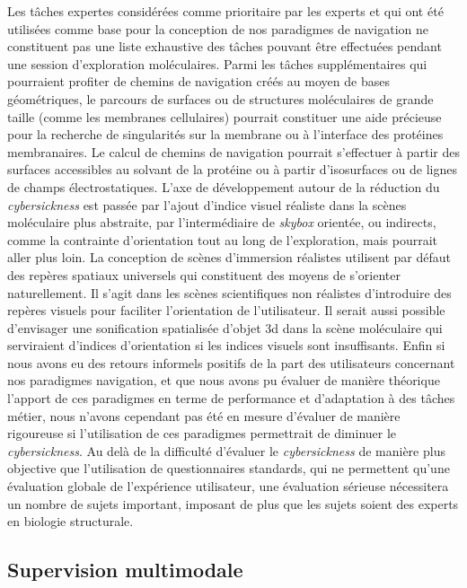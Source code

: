 Les tâches expertes considérées comme prioritaire par les experts et qui ont été utilisées comme base pour la conception de nos paradigmes de navigation ne constituent pas une liste exhaustive des tâches pouvant être effectuées pendant une session d'exploration moléculaires. Parmi les tâches supplémentaires qui pourraient profiter de chemins de navigation créés au moyen de bases géométriques, le parcours de surfaces ou de structures moléculaires de grande taille (comme les membranes cellulaires) pourrait constituer une aide précieuse pour la recherche de singularités sur la membrane ou à l'interface des protéines membranaires. Le calcul de chemins de navigation pourrait s'effectuer à partir des surfaces accessibles au solvant de la protéine ou à partir d'isosurfaces ou de lignes de champs électrostatiques. 
L'axe de développement autour de la réduction du \textit{cybersickness} est passée par l'ajout  d'indice visuel réaliste dans la scènes moléculaire plus abstraite, par l'intermédiaire de \textit{skybox} orientée, ou indirects, comme la contrainte d'orientation tout au long de l'exploration, mais pourrait aller plus loin. La conception de scènes d'immersion réalistes utilisent par défaut des repères spatiaux universels qui constituent des moyens de s'orienter naturellement. Il s'agit dans les scènes scientifiques non réalistes d'introduire des repères visuels pour faciliter l'orientation de l'utilisateur. Il serait aussi possible d'envisager une sonification spatialisée d'objet 3d dans la scène moléculaire qui serviraient d'indices d'orientation si les indices visuels sont insuffisants. Enfin si nous avons eu des retours informels positifs de la part des utilisateurs concernant nos paradigmes navigation, et que nous avons pu évaluer de manière théorique l'apport de ces paradigmes en terme de performance et d'adaptation à des tâches métier, nous n'avons cependant pas été en mesure d'évaluer de manière rigoureuse si l'utilisation de ces paradigmes permettrait de diminuer le \textit{cybersickness}. Au delà de la difficulté d'évaluer le \emph{cybersickness} de manière plus objective que l'utilisation de questionnaires standards, qui ne permettent qu'une évaluation globale de l'expérience utilisateur, une évaluation sérieuse nécessitera un nombre de sujets important, imposant de plus que les sujets soient des experts en biologie structurale.

\subsection*{Supervision multimodale}

